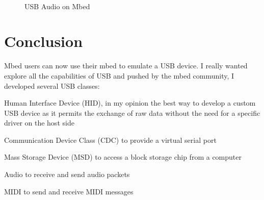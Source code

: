 \documentclass[pdftex,10pt,a4paper]{report}
\newenvironment{packed_item}{
\begin{itemize}
  \setlength{\itemsep}{1pt}
  \setlength{\parskip}{0pt}
  \setlength{\parsep}{0pt}
}{\end{itemize}}
\begin{document}
\begin{figure}[htp]
  \centering
   \\
  \caption{USB Audio on Mbed}
  \label{fig:contour}
\end{figure}
 
 

\section{Conclusion}
Mbed users can now use their mbed to emulate a USB device. I really wanted explore all the capabilities of USB and pushed by the mbed community, I developed several USB classes:
\begin{packed_item}
	\item Human Interface Device (HID), in my opinion the best way to develop a custom USB device as it permits the exchange of raw data without the need for a specific driver on the host side
	\item Communication Device Class (CDC) to provide a virtual serial port
	\item Mass Storage Device (MSD) to access a block storage chip from a computer
	\item Audio to receive and send audio packets
	\item MIDI to send and receive MIDI messages
\end{packed_item}
\end{document}
